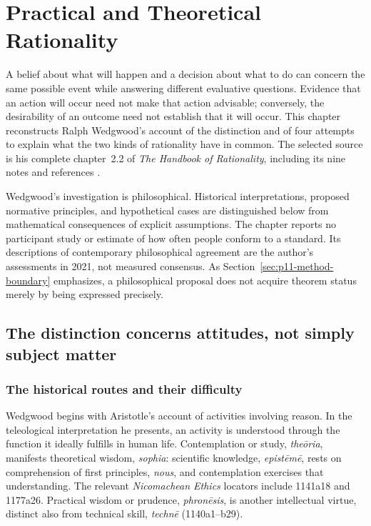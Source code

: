 \chapter{Practical and Theoretical Rationality}
\label{sec:p11-rationality-2-2}

A belief about what will happen and a decision about what to do can concern
the same possible event while answering different evaluative questions.
Evidence that an action will occur need not make that action advisable;
conversely, the desirability of an outcome need not establish that it will
occur. This chapter reconstructs Ralph Wedgwood's account of the distinction
and of four attempts to explain what the two kinds of rationality have in
common. The selected source is his complete chapter~2.2 of
\emph{The Handbook of Rationality}, including its nine notes and references
\parencite[pp.~137--145]{RalphWedgwood2021}.

Wedgwood's investigation is philosophical. Historical interpretations,
proposed normative principles, and hypothetical cases are distinguished
below from mathematical consequences of explicit assumptions. The chapter
reports no participant study or estimate of how often people conform to a
standard. Its descriptions of contemporary philosophical agreement are
the author's assessments in 2021, not measured consensus. As
Section~\ref{sec:p11-method-boundary} emphasizes, a philosophical proposal
does not acquire theorem status merely by being expressed precisely.

\section{The distinction concerns attitudes, not simply subject matter}
\label{sec:p11-rat22-attitudes}

\subsection{The historical routes and their difficulty}

Wedgwood begins with Aristotle's account of activities involving reason.
In the teleological interpretation he presents, an activity is understood
through the function it ideally fulfills in human life. Contemplation or
study, \emph{the\={o}ria}, manifests theoretical wisdom, \emph{sophia}:
scientific knowledge, \emph{epist\={e}m\={e}}, rests on comprehension of first
principles, \emph{nous}, and contemplation exercises that understanding.
The relevant \emph{Nicomachean Ethics} locators include 1141a18 and
1177a26. Practical wisdom or prudence, \emph{phron\={e}sis}, is another
intellectual virtue, distinct also from technical skill, \emph{techn\={e}}
(1140a1--b29).

